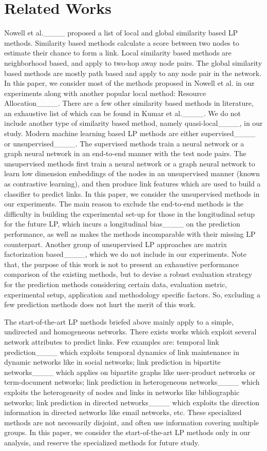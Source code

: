 \section{Related Works}
\label{Rel}
Nowell et al.____ proposed a list of local and global similarity based LP methods. Similarity based methods calculate a score between two nodes to estimate their chance to form a link. Local similarity based methods are neighborhood based, and apply to two-hop away node pairs. The global similarity based methods are mostly path based and apply to any node pair in the network. In this paper, we consider most of the methods proposed in Nowell et al. in our experiments along with another popular local method: Resource Allocation____. There are a few other similarity based methods in literature, an exhaustive list of which can be found in Kumar et al.____. We do not include another type of similarity based method, namely quasi-local____, in our study. Modern machine learning based LP methods are either supervised____ or unsupervised____. The supervised methods train a neural network or a graph neural network in an end-to-end manner with the test node pairs. The unsupervised methods first train a neural network or a graph neural network to learn low dimension embeddings of the nodes in an unsupervised manner (known as contrastive learning), and then produce link features which are used to build a classifier to predict links. In this paper, we consider the unsupervised methods in our experiments. The main reason to exclude the end-to-end methods is the difficulty in building the experimental set-up for those in the longitudinal setup for the future LP, which incurs a longitudinal bias____ on the prediction performance, as well as makes the methods incomparable with their missing LP counterpart. Another group of unsupervised LP approaches are matrix factorization based____, which we do not include in our experiments. Note that, the purpose of this work is not to present an exhaustive performance comparison of the existing methods, but to devise a robust evaluation strategy for the prediction methods considering certain data,  evaluation metric, experimental setup, application and methodology specific factors. So, excluding a few prediction methods does not hurt the merit of this work.

The start-of-the-art LP methods briefed above mainly apply to a simple, undirected and homogeneous networks. There exists works which exploit several network attributes to predict links. Few examples are: temporal link prediction____ which exploits temporal dynamics of link maintenance in dynamic networks like in social networks; link prediction in bipartite networks____ which applies on bipartite graphs like user-product networks or term-document networks; link prediction in heterogeneous networks____ which exploits the heterogeneity of nodes and links in networks like bibliographic networks; link prediction in directed networks____ which exploits the direction information in directed networks like email networks, etc. These specialized methods are not necessarily disjoint, and often use information covering multiple groups. In this paper, we consider the start-of-the-art LP methods only in our analysis, and reserve the specialized methods for future study.

